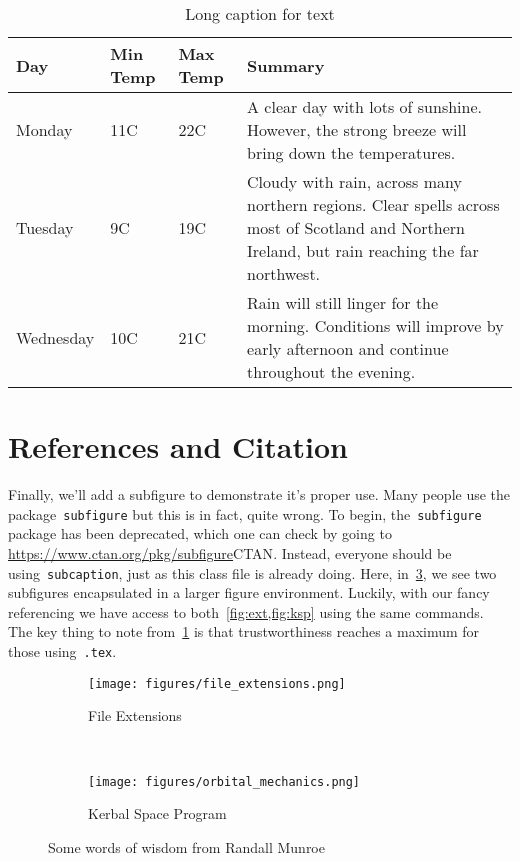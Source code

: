 \begin{table}
    \centering
    \begin{tabular}{ | l | l | l | p{5cm} |}
    \hline
    Day & Min Temp & Max Temp & Summary \\ 
    \hline
    Monday & 11C & 22C & A clear day with lots of sunshine.  
    However, the strong breeze will bring down the temperatures. \\ 
    \hline
    Tuesday & 9C & 19C & Cloudy with rain, across many northern regions. Clear spells
    across most of Scotland and Northern Ireland, 
    but rain reaching the far northwest. \hfill \\ 
    \hline
    Wednesday & 10C & 21C & Rain will still linger for the morning. \hfill 
    Conditions will improve by early afternoon and continue 
    throughout the evening.\\
    \hline
    \end{tabular}
    \caption[Short caption for table]{Long caption for text \label{tab:table}}
\end{table}

\section{References and Citation}
Finally, we'll add a subfigure to demonstrate it's proper use. 
Many people use the package~\verb+subfigure+ but this is in fact, quite wrong. 
To begin, the~\verb+subfigure+ package has been deprecated, which one can check by going to \url{https://www.ctan.org/pkg/subfigure}{CTAN}.
Instead, everyone should be using~\verb+subcaption+, just as this class file is already doing.
Here, in~\cref{fig:xkcd}, we see two subfigures encapsulated in a larger figure environment.
Luckily, with our fancy referencing we have access to both~\cref{fig:ext,fig:ksp} using the same commands.
The key thing to note from~\cref{fig:ext} is that trustworthiness reaches a maximum for those using~\verb+.tex+.
\begin{figure}[htbp] 
    \centering 
    \begin{subfigure}[htbp]{0.4\textwidth} 
        \texttt{[image: figures/file\_extensions.png]} 
        \caption{File Extensions} \label{fig:ext} 
    \end{subfigure}~ %
    \begin{subfigure}[htbp]{0.5\textwidth} 
        \texttt{[image: figures/orbital\_mechanics.png]} 
        \caption{Kerbal Space Program} \label{fig:ksp} 
    \end{subfigure}
    \caption[XKCD]{Some words of wisdom from Randall Munroe}
    \label{fig:xkcd} 
\end{figure}

